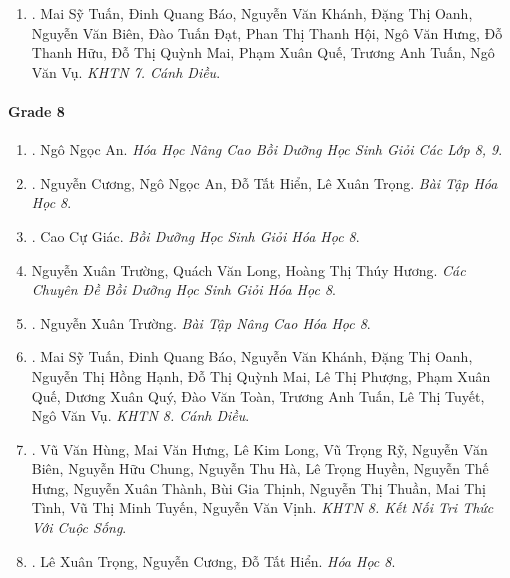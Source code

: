 \documentclass{article}
\begin{document}
\begin{enumerate}
	\item \cite{SGK_KHTN_7_Canh_Dieu}. Mai Sỹ Tuấn, Đinh Quang Báo, Nguyễn Văn Khánh, Đặng Thị Oanh, Nguyễn Văn Biên, Đào Tuấn Đạt, Phan Thị Thanh Hội, Ngô Văn Hưng, Đỗ Thanh Hữu, Đỗ Thị Quỳnh Mai, Phạm Xuân Quế, Trương Anh Tuấn, Ngô Văn Vụ. {\it KHTN 7. Cánh Diều}.\hfill{\sf[reading]}
\end{enumerate}

\paragraph{Grade 8}

\begin{enumerate}
	\item \cite{An_Hoa_Hoc_nang_cao_8_9}. Ngô Ngọc An. {\it Hóa Học Nâng Cao Bồi Dưỡng Học Sinh Giỏi Các Lớp 8, 9}.\hfill{\sf[done]}
	
	\item \cite{SBT_Hoa_Hoc_8}. Nguyễn Cương, Ngô Ngọc An, Đỗ Tất Hiển, Lê Xuân Trọng. {\it Bài Tập Hóa Học 8}.\hfill{\sf[reading]}
	
	\item \cite{Giac2021}. Cao Cự Giác. {\it Bồi Dưỡng Học Sinh Giỏi Hóa Học 8}.\hfill{\sf[reading]}
	
	\item Nguyễn Xuân Trường, Quách Văn Long, Hoàng Thị Thúy Hương. {\it Các Chuyên Đề Bồi Dưỡng Học Sinh Giỏi Hóa Học 8}.
	
	\item \cite{Truong_BTNC_Hoa_Hoc_8_2022}. Nguyễn Xuân Trường. {\it Bài Tập Nâng Cao Hóa Học 8}.\hfill{\sf[reading]}
	
	\item \cite{SGK_KHTN_8_Canh_Dieu}. Mai Sỹ Tuấn, Đinh Quang Báo, Nguyễn Văn Khánh, Đặng Thị Oanh, Nguyễn Thị Hồng Hạnh, Đỗ Thị Quỳnh Mai, Lê Thị Phượng, Phạm Xuân Quế, Dương Xuân Quý, Đào Văn Toàn, Trương Anh Tuấn, Lê Thị Tuyết, Ngô Văn Vụ. {\it KHTN 8. Cánh Diều}.\hfill{\sf[reading]}
	
	\item \cite{SGK_KHTN_8_KNTTVCS}. Vũ Văn Hùng, Mai Văn Hưng, Lê Kim Long, Vũ Trọng Rỹ, Nguyễn Văn Biên, Nguyễn Hữu Chung, Nguyễn Thu Hà, Lê Trọng Huyền, Nguyễn Thế Hưng, Nguyễn Xuân Thành, Bùi Gia Thịnh, Nguyễn Thị Thuần, Mai Thị Tình, Vũ Thị Minh Tuyến, Nguyễn Văn Vịnh. {\it KHTN 8. Kết Nối Tri Thức Với Cuộc Sống}.\hfill{\sf[reading]}
	
	\item \cite{SGK_Hoa_Hoc_8}. Lê Xuân Trọng, Nguyễn Cương, Đỗ Tất Hiển. {\it Hóa Học 8}.\hfill{\sf[reading]}
\end{enumerate}
\end{document}
